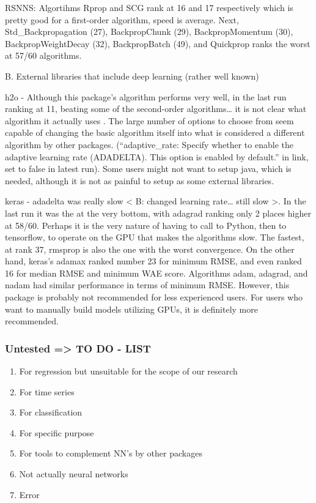 RSNNS: Algortihms Rprop and SCG rank at 16 and 17 respectively which is
pretty good for a first-order algorithm, speed is average. Next,
Std\_Backpropagation (27), BackpropChunk (29), BackpropMomentum (30),
BackpropWeightDecay (32), BackpropBatch (49), and Quickprop ranks the
worst at 57/60 algorithms.

B. External libraries that include deep learning (rather well known)

h2o - Although this package's algorithm performs very well, in the last
run ranking at 11, beating some of the second-order algorithms\ldots{}
it is not clear what algorithm it actually uses . The large number of
options to choose from seem capable of changing the basic algorithm
itself into what is considered a different algorithm by other packages.
(``adaptive\_rate: Specify whether to enable the adaptive learning rate
(ADADELTA). This option is enabled by default.'' in link, set to false
in latest run). Some users might not want to setup java, which is
needed, although it is not as painful to setup as some external
libraries.

keras - adadelta was really slow \textless{} B: changed learning
rate\ldots{} still slow \textgreater. In the last run it was the at the
very bottom, with adagrad ranking only 2 places higher at 58/60. Perhaps
it is the very nature of having to call to Python, then to tensorflow,
to operate on the GPU that makes the algorithms slow. The fastest, at
rank 37, rmsprop is also the one with the worst convergence. On the
other hand, keras's adamax ranked number 23 for minimum RMSE, and even
ranked 16 for median RMSE and minimum WAE score. Algorithms adam,
adagrad, and nadam had similar performance in terms of minimum RMSE.
However, this package is probably not recommended for less experienced
users. For users who want to manually build models utilizing GPUs, it is
definitely more recommended.

\hypertarget{untested-to-do---list}{%
\subsubsection{Untested =\textgreater{} TO DO -
LIST}\label{untested-to-do---list}}

\begin{enumerate}
\def\labelenumi{\arabic{enumi}.}
\tightlist
\item
  For regression but unsuitable for the scope of our research
\item
  For time series
\item
  For classification
\item
  For specific purpose
\item
  For tools to complement NN's by other packages
\item
  Not actually neural networks
\item
  Error 
\end{enumerate}

